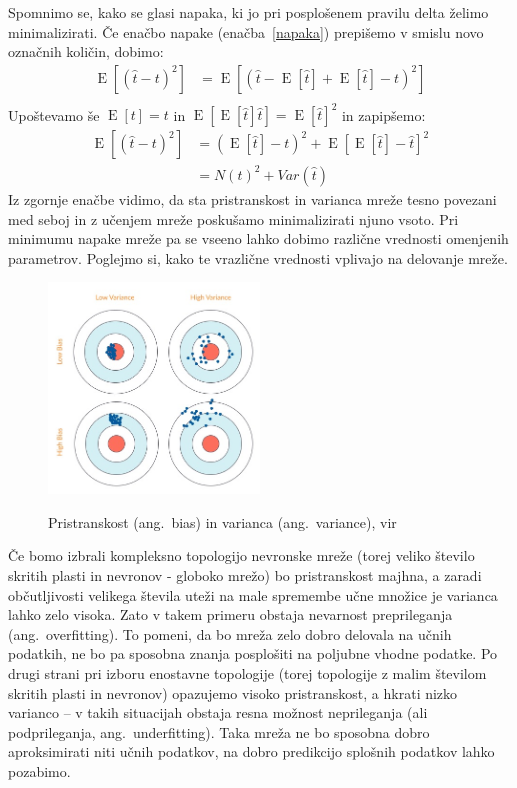 \documentclass[mat1]{fmfdelo}
\begin{document}
Spomnimo se, kako se glasi napaka, ki jo pri posplošenem pravilu delta želimo minimalizirati. Če enačbo napake (enačba~\eqref{napaka}) prepišemo v smislu novo označnih količin, dobimo:
%
\begin{equation}
\begin{aligned}
\operatorname{E}[(\hat{t}-t)^2] &= \operatorname{E}[(\hat{t} -\operatorname{E}[\hat{t}] + \operatorname{E}[\hat{t}] - t)^2]  \\
\end{aligned}
\end{equation}
Upoštevamo še $\operatorname{E}[t] = t$ in $\operatorname{E}[\operatorname{E}[\hat{t}]\hat{t}] = \operatorname{E}[\hat{t}]^2$ in zapipšemo:
\begin{equation}
\begin{aligned}
\operatorname{E}[(\hat{t}-t)^2] &= (\operatorname{E}[\hat{t}] - t)^2 +\operatorname{E}[\operatorname{E}[\hat{t}] -\hat{t}]^2\\
&= N(t)^2 + Var(\hat{t})
\end{aligned}
\end{equation}
%
Iz zgornje enačbe vidimo, da sta pristranskost in varianca mreže tesno povezani med seboj in z učenjem mreže poskušamo minimalizirati njuno vsoto. Pri minimumu napake mreže pa se vseeno lahko dobimo različne vrednosti omenjenih parametrov. Poglejmo si, kako te vrazlične vrednosti vplivajo na delovanje mreže.
%
\begin{figure}[!ht]
  \centering
    \includegraphics[width=0.5\textwidth]{bias.jpg}
  \label{fig:bis}
 \caption{Pristranskost (ang.~bias) in varianca (ang.~variance), vir\cite{bias}}
\end{figure}
%

Če bomo izbrali kompleksno topologijo nevronske mreže (torej veliko število skritih plasti in nevronov - globoko mrežo) bo pristranskost majhna, a zaradi občutljivosti velikega števila uteži na male spremembe učne množice je varianca lahko zelo visoka. Zato v takem primeru obstaja nevarnost preprileganja (ang.~overfitting). To pomeni, da bo mreža zelo dobro delovala na učnih podatkih, ne bo pa sposobna znanja posplošiti na poljubne vhodne podatke.
Po drugi strani pri izboru enostavne topologije (torej topologije z malim številom skritih plasti in nevronov) opazujemo visoko pristranskost, a hkrati nizko varianco -- v takih situacijah obstaja resna možnost neprileganja (ali podprileganja, ang.~underfitting). Taka mreža ne bo sposobna dobro aproksimirati niti učnih podatkov, na dobro predikcijo splošnih podatkov lahko pozabimo.
\end{document}
